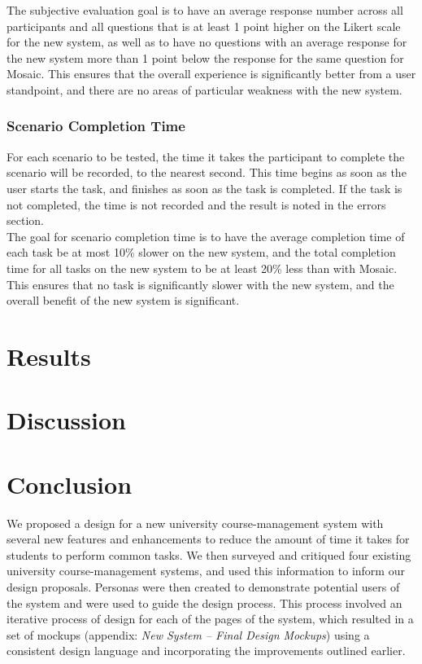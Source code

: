 \documentclass[10pt]{article}
\begin{document}
\begin{multicols}{2}
The subjective evaluation goal is to have an average response number across all participants and all questions that is at least 1 point higher on the Likert scale for the new system, as well as to have no questions with an average response for the new system more than 1 point below the response for the same question for Mosaic. This ensures that the overall experience is significantly better from a user standpoint, and there are no areas of particular weakness with the new system.

\subsubsection*{Scenario Completion Time}
For each scenario to be tested, the time it takes the participant to complete the scenario will be recorded, to the nearest second. This time begins as soon as the user starts the task, and finishes as soon as the task is completed. If the task is not completed, the time is not recorded and the result is noted in the errors section.\\

The goal for scenario completion time is to have the average completion time of each task be at most 10\% slower on the new system, and the total completion time for all tasks on the new system to be at least 20\% less than with Mosaic. This ensures that no task is significantly slower with the new system, and the overall benefit of the new system is significant.

\section*{Results}
\section*{Discussion}
\section*{Conclusion}
We proposed a design for a new university course-management system with several new features and enhancements to reduce the amount of time it takes for students to perform common tasks. We then surveyed and critiqued four existing university course-management systems, and used this information to inform our design proposals. Personas were then created to demonstrate potential users of the system and were used to guide the design process. This process involved an iterative process of design for each of the pages of the system, which resulted in a set of mockups (appendix: \emph{New System -- Final Design Mockups}) using a consistent design language and incorporating the improvements outlined earlier.\\


\end{multicols}
\end{document}
